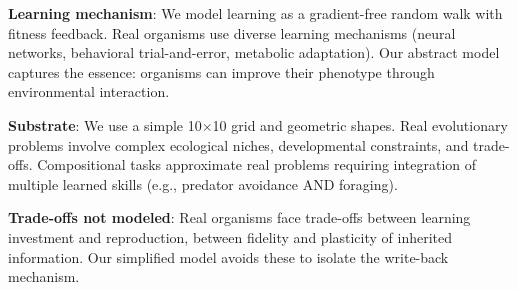 \documentclass[twocolumn]{article}
\begin{document}
\textbf{Learning mechanism}: We model learning as a gradient-free random walk with fitness feedback. Real organisms use diverse learning mechanisms (neural networks, behavioral trial-and-error, metabolic adaptation). Our abstract model captures the essence: organisms can improve their phenotype through environmental interaction.

\textbf{Substrate}: We use a simple 10$\times$10 grid and geometric shapes. Real evolutionary problems involve complex ecological niches, developmental constraints, and trade-offs. Compositional tasks approximate real problems requiring integration of multiple learned skills (e.g., predator avoidance AND foraging).

\textbf{Trade-offs not modeled}: Real organisms face trade-offs between learning investment and reproduction, between fidelity and plasticity of inherited information. Our simplified model avoids these to isolate the write-back mechanism.
\end{document}
